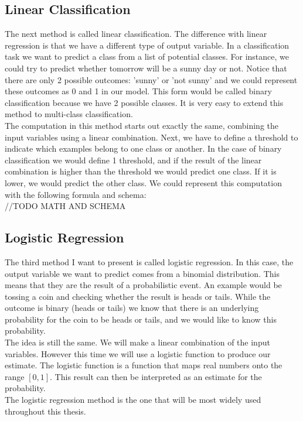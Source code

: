 \subsection{Linear Classification}
The next method is called linear classification. The difference with linear regression is that we have a different type of output variable. In a classification task we want to predict a class from a list of potential classes. For instance, we could try to predict whether tomorrow will be a sunny day or not. Notice that there are only 2 possible outcomes: 'sunny' or 'not sunny' and we could represent these outcomes as 0 and 1 in our model. This form would be called binary classification because we have 2 possible classes. It is very easy to extend this method to multi-class classification.\\
The computation in this method starts out exactly the same, combining the input variables using a linear combination. Next, we have to define a threshold to indicate which examples belong to one class or another. In the case of binary classification we would define 1 threshold, and if the result of the linear combination is higher than the threshold we would predict one class. If it is lower, we would predict the other class. We could represent this computation with the following formula and schema: \\
//TODO MATH AND SCHEMA\\

\subsection{Logistic Regression}
The third method I want to present is called logistic regression. In this case, the output variable we want to predict comes from a binomial distribution. This means that they are the result of a probabilistic event. An example would be tossing a coin and checking whether the result is heads or tails. While the outcome is binary (heads or tails) we know that there is an underlying probability for the coin to be heads or tails, and we would like to know this probability. \\
The idea is still the same. We will make a linear combination of the input variables. However this time we will use a logistic function to produce our estimate. The logistic function is a function that maps real numbers onto the range $[0,1]$. This result can then be interpreted as an estimate for the probability. \\
The logistic regression method is the one that will be most widely used throughout this thesis.

